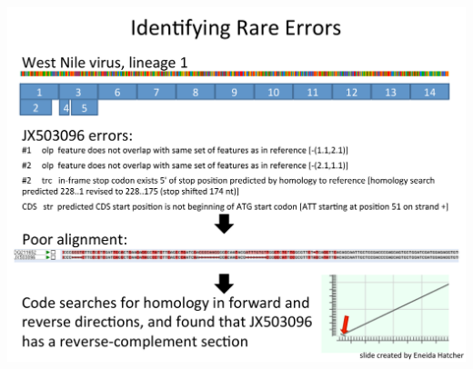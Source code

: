 \documentclass[landscape]{slides}
\begin{document}
\begin{slide}
\begin{center}
\includegraphics[height=8in]{figs/eneida-slide-4}
\vfill
\end{center}
\end{slide}
\end{document}
